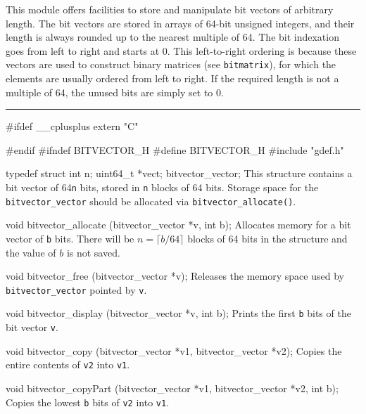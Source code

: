 
This module offers facilities to store and manipulate bit vectors of arbitrary length.
The bit vectors are stored in arrays of 64-bit unsigned integers, and their length
is always rounded up to the nearest multiple of 64.
The bit indexation goes from left to right and starts at 0.
This left-to-right ordering is because these vectors are used to construct
binary matrices (see \texttt{bitmatrix}),
for which the elements are usually ordered from left to right.
If the required length is not a multiple of 64, the unused bits are simply set to 0.


\bigskip\hrule

\code\hide

#ifdef __cplusplus
extern "C" {
#endif
#ifndef BITVECTOR_H
#define BITVECTOR_H
\endhide
#include "gdef.h"
\endcode
\iffalse %
\code

#define bitvector_WL 64
\endcode
 \tab
Uses 64-bit words.   \pierre{Probably not needed, can be hardcoded to 64.}
 \endtab
\fi  %
\code

typedef struct{
   int n;
   uint64_t *vect;
} bitvector_vector;
\endcode
\tab
This structure contains a bit vector of 64\texttt{n} bits,
stored in {\tt n} blocks of 64 bits.
Storage space for the {\tt bitvector\_vector} should be allocated via
{\tt bitvector\_allocate()}.
\endtab
\code

void bitvector_allocate (bitvector_vector *v, int b);
\endcode
 \tab
Allocates memory for a bit vector of {\tt b} bits.
There will be $n = \lceil b/64 \rceil$ blocks of 64 bits in the structure
and the value of $b$ is not saved.
 \endtab
\code

void bitvector_free (bitvector_vector *v);
\endcode
 \tab
Releases the memory space used by {\tt bitvector\_vector} pointed by {\tt v}.
 \endtab
\code

void bitvector_display (bitvector_vector *v, int b);
\endcode
 \tab
Prints the first {\tt b} bits of the bit vector {\tt v}.
 \endtab
\code

void bitvector_copy (bitvector_vector *v1, bitvector_vector *v2);
  \endcode
 \tab
Copies the entire contents of {\tt v2} into {\tt v1}.
 \endtab
\code

void bitvector_copyPart (bitvector_vector *v1, bitvector_vector *v2, int b);
\endcode
 \tab
Copies the lowest {\tt b} bits of {\tt v2} into {\tt v1}.
 \endtab
\code

}
